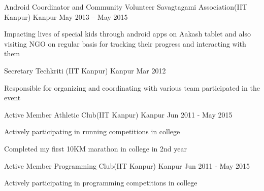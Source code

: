 

\begin{cventries}

  \cventry
    {Android Coordinator and Community Volunteer} %
    {Savagtagami Association(IIT Kanpur)} %
    {Kanpur} %
    {May 2013 – May 2015} %
    {
      \begin{cvitems} %
        \item {Impacting lives of special kids through android apps on Aakash tablet and also visiting NGO on regular basis for tracking their progress and interacting with them}
      \end{cvitems}
    }

  \cventry
    {Secretary} %
    {Techkriti (IIT Kanpur)} %
    {Kanpur} %
    {Mar 2012} %
    {
      \begin{cvitems} %
        \item {Responsible for organizing and coordinating with various team participated in the event}
      \end{cvitems}
    }

\cventry
    {Active Member} %
    {Athletic Club(IIT Kanpur)} %
    {Kanpur} %
    {Jun 2011 - May 2015} %
    {
      \begin{cvitems} %
        \item {Actively participating in running competitions in college}
        \item {Completed my first 10KM marathon in college in 2nd year}
      \end{cvitems}
    }

\cventry
    {Active Member} %
    {Programming Club(IIT Kanpur)} %
    {Kanpur} %
    {Jun 2011 - May 2015} %
    {
      \begin{cvitems} %
        \item {Actively participating in programming competitions in college}
      \end{cvitems}
    }


\end{cventries}

